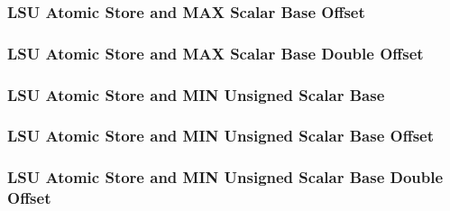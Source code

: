 

\subsubsection[{\small LSU Atomic Store and MAX Scalar Base Offset}]{LSU Atomic Store and MAX Scalar Base Offset} \label{sec:format-LSU-ASMAXSB.O}



\subsubsection[{\small LSU Atomic Store and MAX Scalar Base Double Offset}]{LSU Atomic Store and MAX Scalar Base Double Offset} \label{sec:format-LSU-ASMAXSB.D}



\subsubsection[{\small LSU Atomic Store and MIN Unsigned Scalar Base}]{LSU Atomic Store and MIN Unsigned Scalar Base} \label{sec:format-LSU-ASMINUSB}



\subsubsection[{\small LSU Atomic Store and MIN Unsigned Scalar Base Offset}]{LSU Atomic Store and MIN Unsigned Scalar Base Offset} \label{sec:format-LSU-ASMINUSB.O}



\subsubsection[{\small LSU Atomic Store and MIN Unsigned Scalar Base Double Offset}]{LSU Atomic Store and MIN Unsigned Scalar Base Double Offset} \label{sec:format-LSU-ASMINUSB.D}


